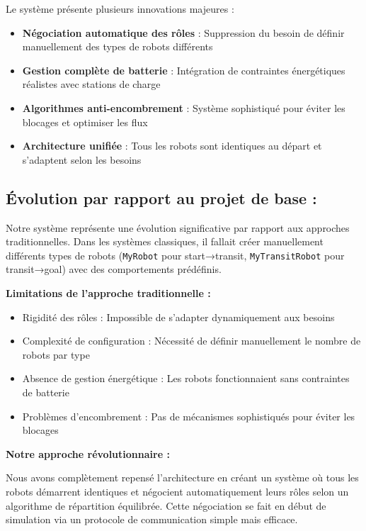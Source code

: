 \documentclass[12pt,a4paper]{article}
\newcommand{\code}[1]{\texttt{#1}}
\begin{document}
Le système présente plusieurs innovations majeures :
\begin{itemize}
  \item \textbf{Négociation automatique des rôles} : Suppression du besoin de définir manuellement des types de robots différents
  \item \textbf{Gestion complète de batterie} : Intégration de contraintes énergétiques réalistes avec stations de charge
  \item \textbf{Algorithmes anti-encombrement} : Système sophistiqué pour éviter les blocages et optimiser les flux
  \item \textbf{Architecture unifiée} : Tous les robots sont identiques au départ et s'adaptent selon les besoins
\end{itemize}

\subsection{Évolution par rapport au projet de base :}

Notre système représente une évolution significative par rapport aux approches traditionnelles. Dans les systèmes classiques, il fallait créer manuellement différents types de robots (\code{MyRobot} pour start→transit, \code{MyTransitRobot} pour transit→goal) avec des comportements prédéfinis.

\textbf{Limitations de l'approche traditionnelle :}
\begin{itemize}
    \item Rigidité des rôles : Impossible de s'adapter dynamiquement aux besoins
    \item Complexité de configuration : Nécessité de définir manuellement le nombre de robots par type
    \item Absence de gestion énergétique : Les robots fonctionnaient sans contraintes de batterie
    \item Problèmes d'encombrement : Pas de mécanismes sophistiqués pour éviter les blocages
\end{itemize}

\textbf{Notre approche révolutionnaire :}

Nous avons complètement repensé l'architecture en créant un système où tous les robots démarrent identiques et négocient automatiquement leurs rôles selon un algorithme de répartition équilibrée. Cette négociation se fait en début de simulation via un protocole de communication simple mais efficace.
\end{document}

